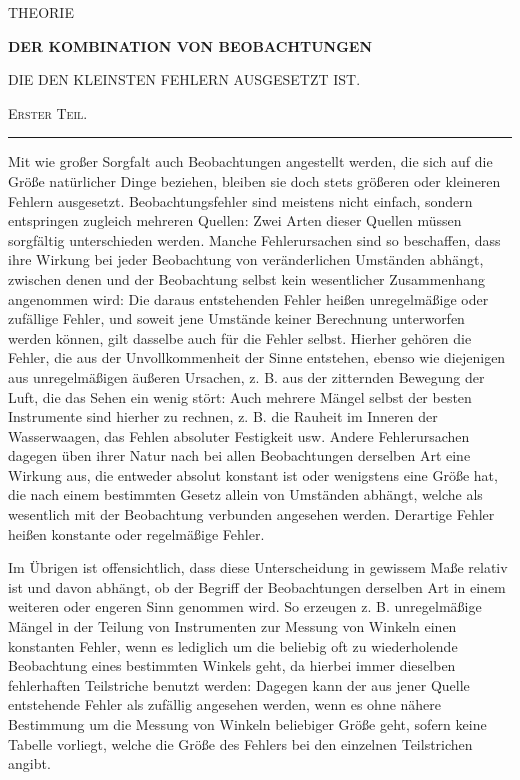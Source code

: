 \clearpage
{}
\begin{center}
{\large THEORIE\par}
\medskip
{\Large\bfseries DER KOMBINATION VON BEOBACHTUNGEN\par}
\medskip
{\large DIE DEN KLEINSTEN FEHLERN AUSGESETZT IST.\par}
\medskip
{\large\textsc{Erster Teil.}\par}
\medskip
\rule{.22\linewidth}{.3pt}
\end{center}
Mit wie großer Sorgfalt auch Beobachtungen angestellt werden, die sich auf die Größe natürlicher Dinge beziehen, bleiben sie doch stets größeren oder kleineren Fehlern ausgesetzt. Beobachtungsfehler sind meistens nicht einfach, sondern entspringen zugleich mehreren Quellen: Zwei Arten dieser Quellen müssen sorgfältig unterschieden werden. Manche Fehlerursachen sind so beschaffen, dass ihre Wirkung bei jeder Beobachtung von veränderlichen Umständen abhängt, zwischen denen und der Beobachtung selbst kein wesentlicher Zusammenhang angenommen wird: Die daraus entstehenden Fehler heißen unregelmäßige oder zufällige Fehler, und soweit jene Umstände keiner Berechnung unterworfen werden können, gilt dasselbe auch für die Fehler selbst. Hierher gehören die Fehler, die aus der Unvollkommenheit der Sinne entstehen, ebenso wie diejenigen aus unregelmäßigen äußeren Ursachen, z. B. aus der zitternden Bewegung der Luft, die das Sehen ein wenig stört: Auch mehrere Mängel selbst der besten Instrumente sind hierher zu rechnen, z. B. die Rauheit im Inneren der Wasserwaagen, das Fehlen absoluter Festigkeit usw. Andere Fehlerursachen dagegen üben ihrer Natur nach bei allen Beobachtungen derselben Art eine Wirkung aus, die entweder absolut konstant ist oder wenigstens eine Größe hat, die nach einem bestimmten Gesetz allein von Umständen abhängt, welche als wesentlich mit der Beobachtung verbunden angesehen werden. Derartige Fehler heißen konstante oder regelmäßige Fehler.

Im Übrigen ist offensichtlich, dass diese Unterscheidung in gewissem Maße relativ ist und davon abhängt, ob der Begriff der Beobachtungen derselben Art in einem weiteren oder engeren Sinn genommen wird. So erzeugen z. B. unregelmäßige Mängel in der Teilung von Instrumenten zur Messung von Winkeln einen konstanten Fehler, wenn es lediglich um die beliebig oft zu wiederholende Beobachtung eines bestimmten Winkels geht, da hierbei immer dieselben fehlerhaften Teilstriche benutzt werden: Dagegen kann der aus jener Quelle entstehende Fehler als zufällig angesehen werden, wenn es ohne nähere Bestimmung um die Messung von Winkeln beliebiger Größe geht, sofern keine Tabelle vorliegt, welche die Größe des Fehlers bei den einzelnen Teilstrichen angibt.

